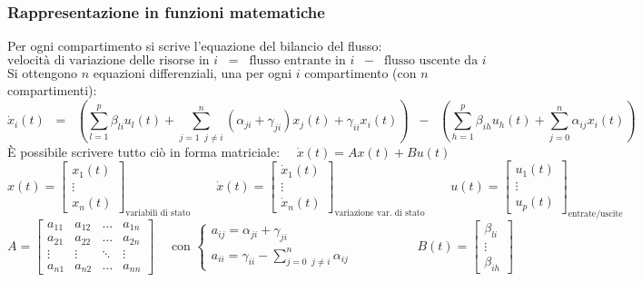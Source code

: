 \subsubsection*{Rappresentazione in funzioni matematiche}
Per ogni compartimento si scrive l'equazione del bilancio del flusso:
\[\text{velocità di variazione delle risorse in } i \;\; = \;\; \text{flusso entrante in } i \;\; - \;\; \text{flusso uscente da } i\]
Si ottengono \(n\) equazioni differenziali, una per ogni \(i\) compartimento (con \(n\) compartimenti):
\[\dot{x}_i(t) \;\; = \;\; \left(\sum_{l=1}^{p} \beta_{li} u_l(t) + \sum_{j = 1 \;\; j \neq i}^{n} (\alpha_{ji} + \gamma_{ji}) x_j(t) + \gamma_{ii} x_i(t)\right) \;\; - \;\; \left(\sum_{h=1}^{p} \beta_{ih} u_h(t) + \sum_{j=0}^{n} \alpha_{ij} x_i(t)\right)\]
È possibile scrivere tutto ciò in forma matriciale: \(\quad \dot{x}(t) = Ax(t) + Bu(t)\)
\[x(t) = \left[\begin{matrix} x_1(t) \\ \vdots \\ x_n(t) \end{matrix}\right]_\text{variabili di stato} \qquad
\dot{x}(t) = \left[\begin{matrix} \dot{x}_1(t) \\ \vdots \\ \dot{x}_n(t) \end{matrix}\right]_\text{variazione var. di stato} \qquad
u(t) = \left[\begin{matrix} u_1(t) \\ \vdots \\ u_p(t) \end{matrix}\right]_\text{entrate/uscite}\]
\[A = \left[\begin{matrix} a_{11} & a_{12} & \dots & a_{1n} \\ a_{21} & a_{22} & \dots & a_{2n} \\ \vdots & \vdots & \ddots & \vdots \\ a_{n1} & a_{n2} & \dots & a_{nn} \end{matrix}\right] \quad
\text{ con } \begin{cases} a_{ij} = \alpha_{ji} + \gamma_{ji} \\[5pt] \displaystyle a_{ii} = \gamma_{ii} - \sum_{j = 0 \;\; j \neq i}^{n} \alpha_{ij} \end{cases} \qquad\qquad\quad
B(t) = \left[\begin{matrix} \beta_{li} \\ \vdots \\ \beta_{ih} \end{matrix}\right] \qquad\qquad\quad\]

